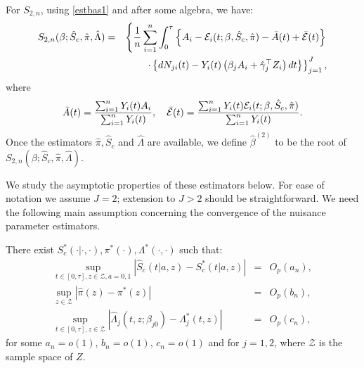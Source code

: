 \documentclass[11pt]{article}
\newcommand{\ee}{\end{eqnarray}}
\newcommand{\eqnn}{\begin{eqnarray*}}
\newcommand{\een}{\end{eqnarray*}}
\newcommand{\be}{\begin{eqnarray}}
\begin{document}
For $S_{2,n}$, %
using \eqref{estbas1} %
and after some  algebra, we have:
\be\label{score2s}
{S}_{2,n}(\beta; \hat S_c, \hat \pi,\hat  \Lambda)&=&\left\{\frac{1}{n}\sum_{i=1}^n\int_0^\tau \left\{{A}_i-{\cal E}_{i}(t; \beta, \hat S_c, \hat \pi)-\bar{A}(t)+\bar{\cal E}(t) \right\}\right.\\&&\left. \cdot \left\{dN_{ji}(t)-Y_i(t)\left(\beta_j A_i+\hat \gamma_j^\top Z_i\right)dt\right\}\right\}_{j=1}^J,\nonumber
\ee
where
\eqnn
\bar{A}(t)=\frac{\sum_{i=1}^nY_i(t)A_i}{\sum_{i=1}^nY_i(t)},\quad
\bar{\cal E}(t)=\frac{\sum_{i=1}^nY_i(t){\cal E}_{i}(t; \beta, \hat S_c, \hat \pi)}{\sum_{i=1}^nY_i(t)}.
\een
Once the estimators $\hat \pi, \hat S_c$ and $\hat \Lambda$ are available, we define 
$\hat \beta^{(2)}$ to be the root of ${S}_{2,n}(\beta ; \hat S_c, \hat\pi, \hat\Lambda)$.
 
We  study the asymptotic properties of these estimators below. For ease of notation we  assume $J=2$;  extension to  $J>2$ should be straightforward.
We need the following main assumption concerning the convergence of the nuisance parameter estimators. 
\begin{assumption}\label{assumption} 
There exist $S^{*}_c(\cdot| \cdot,\cdot), \pi^{*}(\cdot),\Lambda^{*}(\cdot,\cdot)$ such that: 
\eqnn
\sup_{t \in [0,\tau], z\in \mathcal{Z}, a=0,1}\left|\hat S_c(t | a,z)- S^{*}_c(t | a,z)\right|&=&O_p(a_n),
\\
\sup_{z\in \mathcal{Z}}\left|\hat \pi(z)- \pi^{*}(z)\right|&=&O_p(b_n),
\\
\sup_{t \in [0,\tau], z\in \mathcal{Z}}\left|\hat \Lambda_j(t,z ; \beta_{j0})- \Lambda^{*}_j(t,z)\right|&=&O_p(c_n),
\een
for some $a_n=o(1)$, $b_n=o(1)$, $c_n=o(1)$ and for $j=1,2$, where $ \mathcal{Z}$ is the sample space of $Z$.
\end{assumption}
\end{document}
